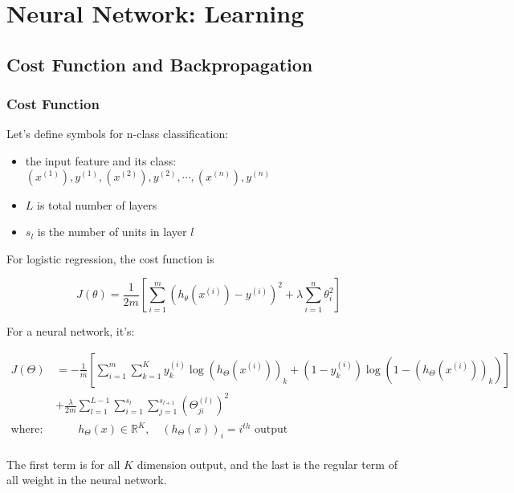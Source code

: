 \documentclass[en,11pt,english,black,simple]{../elegantbook}
\begin{document}
\fi 
\def\chapname{05nntrain}

\chapter{Neural Network: Learning}

\section{Cost Function and Backpropagation}

\subsection{Cost Function}

Let's define symbols for n-class classification:

\begin{itemize}
    \item the input feature and its class: \({(x^{(1)}), y^{(1)}},{(x^{(2)}), y^{(2)}},\cdots,{(x^{(n)}), y^{(n)}}\)
    \item \(L\) is total number of layers
    \item \(s_l\) is the number of units in layer \(l\)
\end{itemize}

For logistic regression, the cost function is 


\[J(\theta) = \frac{1}{2m}\left[\sum_{i=1}^m(h_\theta(x^{(i)}) - y^{(i)})^2 + \lambda \sum_{i=1}^n\theta_i^2 \right]\]

For a neural network, it's:

\[\begin{aligned}
    J(\Theta)&=-\frac{1}{m}\left[\sum_{i=1}^{m} \sum_{k=1}^{K} y_{k}^{(i)} \log \left(h_{\Theta}\left(x^{(i)}\right)\right)_{k}+\left(1-y_{k}^{(i)}\right) \log \left(1-\left(h_{\Theta}\left(x^{(i)}\right)\right)_{k}\right)\right] \\
    &+\frac{\lambda}{2 m} \sum_{l=1}^{L-1} \sum_{i=1}^{s_{l}} \sum_{j=1}^{s_{l+1}}\left(\Theta_{j i}^{(l)}\right)^{2}\\
    \text{where: }& \quad \quad h_{\Theta}(x) \in \mathbb{R}^{K}, \quad\left(h_{\Theta}(x)\right)_{i}=i^{t h} \text { output } \\
\end{aligned}\]

The first term is for all \(K\) dimension output, and the last is the regular term of all weight in the neural network.
\end{document}
